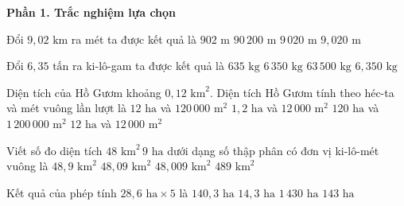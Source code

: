 \textbf{Phần 1. Trắc nghiệm lựa chọn}

\begin{ex} %
Đổi $9{,}02\text{ km}$ ra mét ta được kết quả là
\choice
{$902\text{ m}$}
{$90\,200\text{ m}$}
{\True $9\,020\text{ m}$}
{$9{,}020\text{ m}$}
\end{ex}

\begin{ex} %
Đổi $6{,}35\text{ tấn}$ ra ki-lô-gam ta được kết quả là
\choice
{$635\text{ kg}$}
{\True $6\,350\text{ kg}$}
{$63\,500\text{ kg}$}
{$6{,}350\text{ kg}$}
\end{ex}

\begin{ex} %
Diện tích của Hồ Gươm khoảng $0{,}12\text{ km}^2$. Diện tích Hồ Gươm tính theo héc-ta và mét vuông lần lượt là
\choice
{\True $12\text{ ha}$ và $120\,000\text{ m}^2$}
{$1{,}2\text{ ha}$ và $12\,000\text{ m}^2$}
{$120\text{ ha}$ và $1\,200\,000\text{ m}^2$}
{$12\text{ ha}$ và $12\,000\text{ m}^2$}
\end{ex}

\begin{ex} %
Viết số đo diện tích $48\text{ km}^2\,9\text{ ha}$ dưới dạng số thập phân có đơn vị ki-lô-mét vuông là
\choice
{$48{,}9\text{ km}^2$}
{\True $48{,}09\text{ km}^2$}
{$48{,}009\text{ km}^2$}
{$489\text{ km}^2$}
\end{ex}

\begin{ex} %
Kết quả của phép tính $28{,}6\text{ ha} \times 5$ là
\choice
{$140{,}3\text{ ha}$}
{$14{,}3\text{ ha}$}
{$1\,430\text{ ha}$}
{\True $143\text{ ha}$}
\end{ex}

